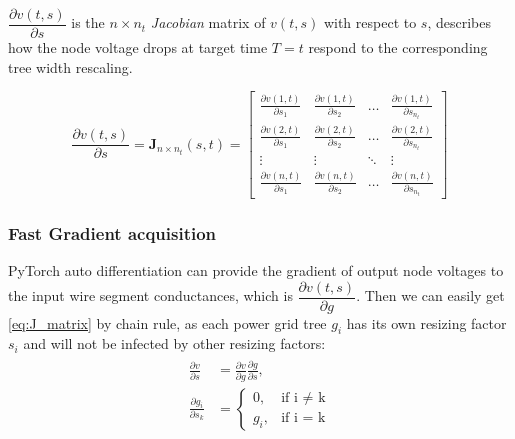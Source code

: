$ \dfrac{\partial v(t, s)}{\partial s}$ is the $n\times n_{t}$ \textit{Jacobian} matrix of $v(t,s)$ with respect to $s$, describes how the node voltage drops at target time $T=t$ respond to the corresponding tree width rescaling.

\begin{equation}
	\label{eq:J_matrix}
	\dfrac{\partial v(t, s)}{\partial s}=
	\mathbf {J}_{n\times n_{t}}(s,t) =
	\begin{bmatrix}
		\frac{\partial v(1,t)}{\partial s_{1}}&\frac{\partial v(1,t)}{\partial s_{2}}&\ldots&\frac{\partial v(1,t)}{\partial s_{n_{t}}}\\
		\frac{\partial v(2,t)}{\partial s_{1}}&\frac{\partial v(2,t)}{\partial s_{2}}&\ldots&\frac{\partial v(2,t)}{\partial s_{n_{t}}}\\
		\vdots&\vdots&\ddots&\vdots\\
		\frac{\partial v(n,t)}{\partial s_{1}}&\frac{\partial v(n,t)}{\partial s_{2}}&\ldots&\frac{\partial v(n,t)}{\partial s_{n_{t}}}
	\end{bmatrix}
\end{equation}



\subsubsection{Fast Gradient acquisition}
PyTorch auto differentiation can provide the gradient of output node voltages to the input wire segment conductances, which is $ \dfrac{\partial v(t, s)}{\partial g}$. Then we can easily get \eqref{eq:J_matrix} by chain rule, as each power grid tree $g_{i}$ has its own resizing factor $s_{i}$ and will not be infected by other resizing factors:
\begin{equation}
	\label{eq:chain_rule}
	\begin{aligned}
	\begin{split}
	\frac{\partial v}{\partial s} & =\frac{\partial v}{\partial g} \frac{\partial g}{\partial s}, \\ 
	\frac{\partial g_{i}}{\partial s_{k}} & = 
    	\begin{cases}
        		0,      &\mbox{if i $\neq$ k} \\ 
        		g_{i},  &\mbox{if i = k} 
    	\end{cases}
	\end{split}
	\end{aligned}
\end{equation}




